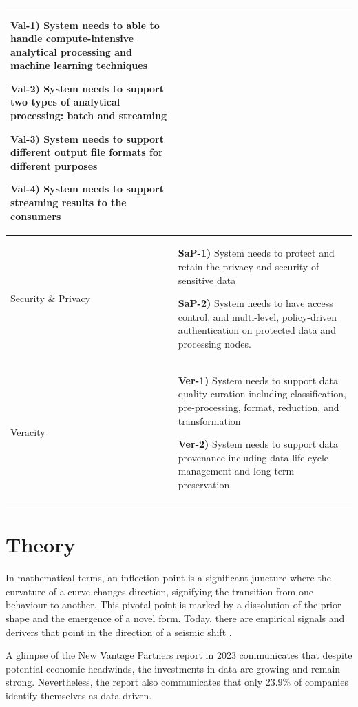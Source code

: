 \documentclass[preprint,12pt]{elsarticle}
\begin{document}
\begin{longtable}{|m{1.4cm}|m{12cm}|}
          \textbf{Val-1)} System needs to able to handle compute-intensive analytical processing and machine learning techniques 
          
          \textbf{Val-2)} System needs to support two types of analytical processing: batch and streaming
          
          \textbf{Val-3)} System needs to support different output file formats for different purposes 
          
          \textbf{Val-4)} System needs to support streaming results to the consumers 
          \\
  
          \hline
  
          Security \& Privacy & 
          
          \textbf{SaP-1)} System needs to protect and retain the privacy and security of sensitive data 
          
          \textbf{SaP-2)} System needs to have access control, and multi-level, policy-driven authentication on protected data and processing nodes. 
          \\
  
          \hline
          
          Veracity &
          
          \textbf{Ver-1)} System needs to support data quality curation including classification, pre-processing, format, reduction, and  transformation 
          
          \textbf{Ver-2)} System needs to support data provenance including data life cycle management and long-term preservation.
          \\
          \hline
  
  \end{longtable}


\section{Theory}
\label{sec:theory}

In mathematical terms, an inflection point is a significant juncture where the curvature of a curve changes direction, signifying the transition from one behaviour to another. This pivotal point is marked by a dissolution of the prior shape and the emergence of a novel form. Today, there are empirical signals and derivers that point in the direction of a seismic shift \cite{mit_tech_review_2023}. 

A glimpse of the New Vantage Partners report in 2023 communicates that despite potential economic headwinds, the investments in data are growing and remain strong. Nevertheless, the report also communicates that only 23.9\% of companies identify themselves as data-driven. 
\end{document}
